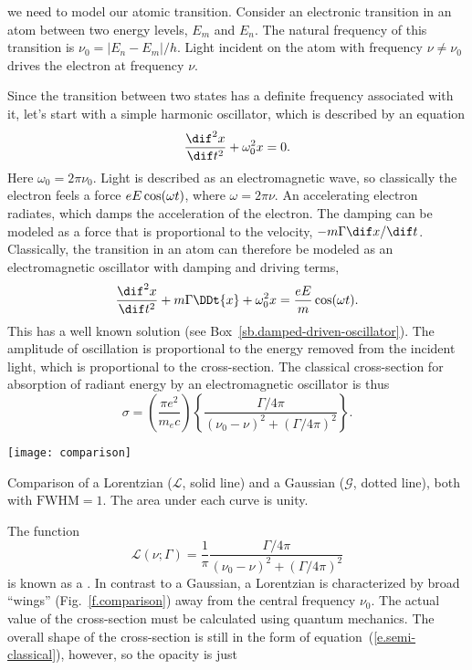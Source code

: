  we need to model our atomic transition. Consider an electronic transition in an atom between two energy levels, $E_m$ and $E_n$. The natural frequency of this transition is $\nu_0 = |E_n-E_m|/h$. Light incident on the atom with frequency $\nu\neq\nu_0$ drives the electron at frequency $\nu$. 

Since the transition between two states has a definite frequency associated with it, let's start with a simple harmonic oscillator, which is described by an equation
\[
	\DDtt{x} + \omega_{0}^{2} x = 0.
\]
Here $\omega_{0} = 2\pi\nu_{0}$. Light is described as an electromagnetic wave, so classically the electron feels a force $eE\cos(\omega t)$, where $\omega = 2\pi \nu$. An accelerating electron radiates, which damps the acceleration of the electron. The damping can be modeled as a force that is proportional to the velocity, $-m\Gamma \dif x/\dif t$. Classically, the transition in an atom can therefore be modeled as an electromagnetic oscillator with damping and driving terms,
\[
	\DDtt{x} + m\Gamma\DDt{x} + \omega_{0}^{2}x = \frac{eE}{m}\cos(\wt).
\]
This has a well known solution (see Box~\ref{sb.damped-driven-oscillator}). The amplitude of oscillation is proportional to the energy removed from the incident light, which is proportional to the cross-section. The classical cross-section for absorption of radiant energy by an electromagnetic oscillator is thus
\begin{equation}\label{e.semi-classical}
    \sigma = \left(\frac{\pi e^2}{m_e c}\right)
    \left\{\frac{\Gamma/4\pi}{(\nu_0-\nu)^2 + (\Gamma/4\pi)^2}\right\}.
\end{equation}
\begin{marginfigure}
\texttt{[image: comparison]}
\caption[Comparison of Lorentzian and Gaussian distributions]{\label{f.comparison}
Comparison of a Lorentzian ($\mathcal{L}$, solid line) and a Gaussian ($\mathcal{G}$, dotted line), both with $\mathrm{FWHM}=1$. The area under each curve is unity.}
\end{marginfigure}
The function
\[
    \mathcal{L}(\nu;\Gamma) = \frac{1}{\pi} 
        \frac{\Gamma/4\pi}{(\nu_0-\nu)^2 + (\Gamma/4\pi)^2}
\]
is known as a .  In contrast to a Gaussian, a Lorentzian is characterized by broad ``wings'' (Fig.~\ref{f.comparison}) away from the central frequency $\nu_{0}$.
The actual value of the cross-section must be calculated using quantum mechanics. The overall shape of the cross-section is still in the form of equation~(\ref{e.semi-classical}), however, so the opacity is just
